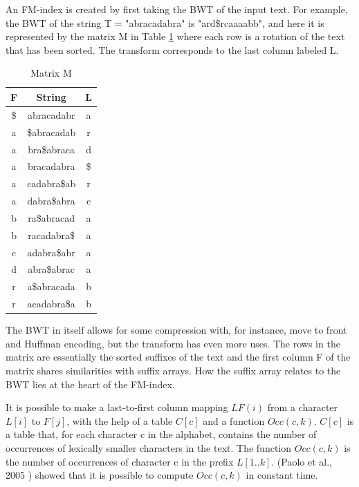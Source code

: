 An FM-index is created by first taking the BWT of the input text. For example, the BWT of the string T = "abracadabra" is "ard\$rcaaaabb", and here it is represented by the matrix M in Table \ref{ex:mm} where each row is a rotation of the text that has been sorted. The transform corresponds to the last column labeled L.

\begin{table}[!htp]
  \caption{Matrix M}
  \label{ex:mm}
  \begin{center}
    \begin{tabular}{c|c|c}
      \hline
      \hline
      F & String & L \\
      \hline
      \$ & abracadabr & a \\
      \hline
      a & \$abracadab & r \\
      \hline
      a & bra\$abraca & d \\
      \hline
      a & bracadabra & \$ \\
      \hline
      a & cadabra\$ab & r \\
      \hline
      a & dabra\$abra & c \\
      \hline
      b & ra\$abracad & a \\
      \hline
      b & racadabra\$ & a \\
      \hline
      c & adabra\$abr & a \\
      \hline
      d & abra\$abrac & a \\
      \hline
      r & a\$abracada & b \\
      \hline
      r & acadabra\$a & b \\
      \hline
    \end{tabular}
  \end{center}
\end{table}

The BWT in itself allows for some compression with, for instance, move to front and Huffman encoding, but the transform has even more uses. The rows in the matrix are essentially the sorted suffixes of the text and the first column F of the matrix shares similarities with suffix arrays. How the suffix array relates to the BWT lies at the heart of the FM-index.

It is possible to make a last-to-first column mapping \(LF(i)\) from a character \(L[i]\) to \(F[j]\), with the help of a table \(C[c]\) and a function \(Occ(c, k)\). \(C[c]\) is a table that, for each character c in the alphabet, contains the number of occurrences of lexically smaller characters in the text. The function \(Occ(c, k)\) is the number of occurrences of character c in the prefix \(L[1..k]\). (Paolo et al., 2005 \cite{paolo2005}) showed that it is possible to compute \(Occ(c, k)\) in constant time.

